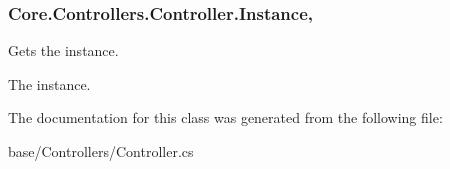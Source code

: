 \subsubsection[{Instance}]{ Core.\+Controllers.\+Controller.\+Instance\hspace{0.3cm}{\ttfamily [static]}, {\ttfamily [get]}}\label{classCore_1_1Controllers_1_1Controller_a083108465e3ad1fc6ccdd7f0c20ef5cb}


Gets the instance. 

The instance.

The documentation for this class was generated from the following file\+:\begin{DoxyCompactItemize}
\item 
base/\+Controllers/Controller.\+cs\end{DoxyCompactItemize}
